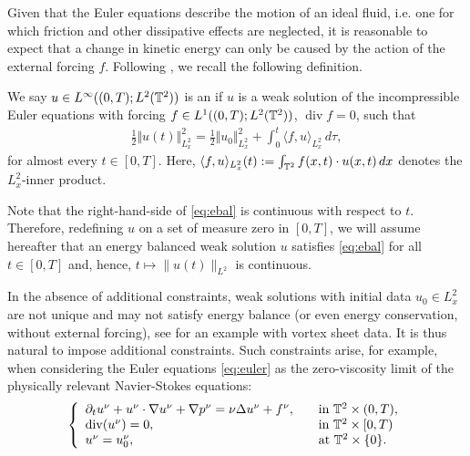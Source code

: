 \documentclass[reqno,12pt]{amsart}
\DeclareMathOperator{\dv}{div}
\begin{document}
Given that the Euler equations describe the motion of an ideal fluid, i.e. one for which friction and other dissipative effects are neglected, it is reasonable to expect that a change in kinetic energy can only be caused by the action of the external forcing $f$. Following \cite{LN2022}, we recall the following definition.

\begin{definition}
  \label{def:ebal}
  We say $u\in L^\infty((0,T);L^2 (\mathbb{T}^2))$ is an  if $u$ is a weak solution of the incompressible Euler equations with forcing $f\in L^1((0,T);L^2(\mathbb{T}^2))$, $\dv f = 0$,  such that
    \begin{align}
      \label{eq:ebal}
      \frac12 \Vert u(t) \Vert^2_{L^2_x}
      =
      \frac12 \Vert u_0 \Vert^2_{L^2_x}
      +
      \int_0^t \langle f, u \rangle_{L^2_x} \, d\tau,
    \end{align}
    for almost every $t \in [0,T]$.
    Here, $\langle f, u \rangle_{L^2_x}(t) := \int_{\mathbb{T}^2} f(x,t) \cdot u(x,t) \, dx$ denotes the $L^2_x$-inner product.
\end{definition}

\begin{remark}
\label{rem:strongtcont}
 Note that the right-hand-side of \eqref{eq:ebal} is continuous with respect to $t$. Therefore, redefining $u$ on a set of measure zero in $[0,T]$, we will assume hereafter that an energy balanced weak solution $u$ satisfies \eqref{eq:ebal} for all $t \in [0,T]$ and, hence, $t \mapsto \|u(t)\|_{L^2}$ is continuous.

\end{remark}

In the absence of additional constraints, weak solutions with initial data $u_0\in L^2_x$ are not unique and may not satisfy energy balance (or even energy conservation, without external forcing), see  \cite{szekelyhidi2011weak} for an example with vortex sheet data. It is thus natural to impose additional constraints. Such constraints arise, for example, when considering the Euler equations \eqref{eq:euler} as the zero-viscosity limit of the physically relevant Navier-Stokes equations:
\begin{gather}
\label{eq:ns}
\left\{
\begin{array}{ll}
  \partial_t u^\nu + u^\nu \cdot \nabla u^\nu + \nabla p^\nu = \nu \Delta u^\nu +  f^\nu,
  \quad &\text{in }\T^2\times (0,T), \\
  \dv(u^\nu) = 0, & \text{in } \T^2 \times [0,T)\\
  u^\nu = u^\nu_0, & \text{at } \T^2 \times \{0\}.
\end{array}
\right.
\end{gather}
\end{document}
